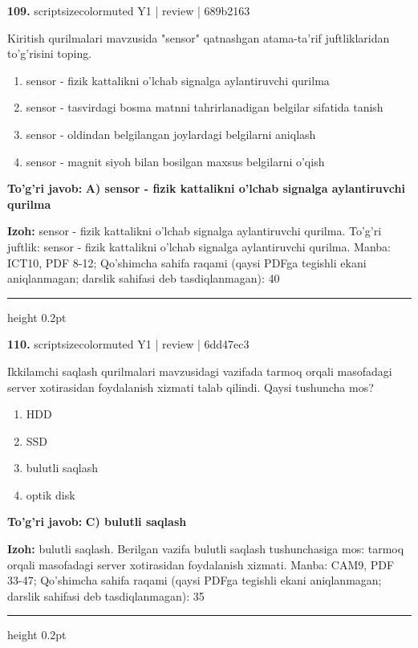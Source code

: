 \documentclass[10pt,a4paper]{article}
\begin{document}
{\bfseries\sffamily\color{ink} 109.} {scriptsizecolor{muted} Y1 | review | 689b2163}
\par
Kiritish qurilmalari mavzusida "sensor" qatnashgan atama-ta'rif juftliklaridan to'g'risini toping.
\begin{enumerate}[label=\Alph*),leftmargin=9mm]
\item sensor - fizik kattalikni o'lchab signalga aylantiruvchi qurilma
\item sensor - tasvirdagi bosma matnni tahrirlanadigan belgilar sifatida tanish
\item sensor - oldindan belgilangan joylardagi belgilarni aniqlash
\item sensor - magnit siyoh bilan bosilgan maxsus belgilarni o'qish
\end{enumerate}
\begin{tcolorbox}[enhanced,breakable,colback=teal!4,colframe=teal!60!black,boxrule=0.45pt,arc=1.2mm,left=2.7mm,right=2.7mm,top=1.8mm,bottom=1.8mm,before skip=2mm,after skip=2mm]
{\bfseries\sffamily\color{teal}To'g'ri javob:} \textbf{A) sensor - fizik kattalikni o'lchab signalga aylantiruvchi qurilma}
\par\smallskip
{\bfseries Izoh:} sensor - fizik kattalikni o'lchab signalga aylantiruvchi qurilma. To'g'ri juftlik: sensor - fizik kattalikni o'lchab signalga aylantiruvchi qurilma. Manba: ICT10, PDF 8-12; Qo'shimcha sahifa raqami (qaysi PDFga tegishli ekani aniqlanmagan; darslik sahifasi deb tasdiqlanmagan): 40
\end{tcolorbox}
\vspace{2mm}\hrule height 0.2pt\vspace{3mm}

{\bfseries\sffamily\color{ink} 110.} {scriptsizecolor{muted} Y1 | review | 6dd47ec3}
\par
Ikkilamchi saqlash qurilmalari mavzusidagi vazifada tarmoq orqali masofadagi server xotirasidan foydalanish xizmati talab qilindi. Qaysi tushuncha mos?
\begin{enumerate}[label=\Alph*),leftmargin=9mm]
\item HDD
\item SSD
\item bulutli saqlash
\item optik disk
\end{enumerate}
\begin{tcolorbox}[enhanced,breakable,colback=teal!4,colframe=teal!60!black,boxrule=0.45pt,arc=1.2mm,left=2.7mm,right=2.7mm,top=1.8mm,bottom=1.8mm,before skip=2mm,after skip=2mm]
{\bfseries\sffamily\color{teal}To'g'ri javob:} \textbf{C) bulutli saqlash}
\par\smallskip
{\bfseries Izoh:} bulutli saqlash. Berilgan vazifa bulutli saqlash tushunchasiga mos: tarmoq orqali masofadagi server xotirasidan foydalanish xizmati. Manba: CAM9, PDF 33-47; Qo'shimcha sahifa raqami (qaysi PDFga tegishli ekani aniqlanmagan; darslik sahifasi deb tasdiqlanmagan): 35
\end{tcolorbox}
\vspace{2mm}\hrule height 0.2pt\vspace{3mm}
\end{document}
